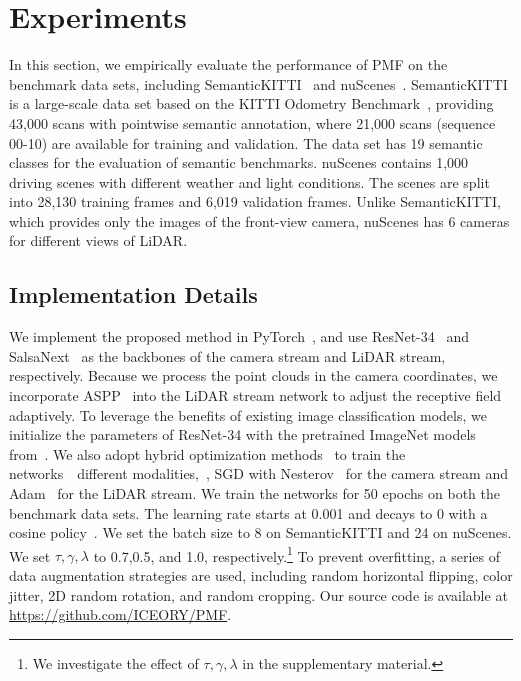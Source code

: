 \documentclass[10pt,twocolumn,letterpaper]{article}
\begin{document}
\section{Experiments}
In this section, we empirically evaluate the performance of PMF on the benchmark data sets, including SemanticKITTI~\cite{behley2019semantickitti} and nuScenes~\cite{caesar2020nuscenes}. SemanticKITTI is a large-scale data set based on the KITTI Odometry Benchmark~\cite{geiger2012we}, providing 43,000 scans with pointwise semantic annotation, where 21,000 scans (sequence 00-10) are available for training and validation. The data set has 19 semantic classes for the evaluation of semantic benchmarks. nuScenes contains 1,000 driving scenes with different weather and light conditions. The scenes are split into 28,130 training frames and 6,019 validation frames. Unlike SemanticKITTI, which provides only the images of the front-view camera, nuScenes has 6 cameras for different views of LiDAR.












\subsection{Implementation Details}
We implement the proposed method in PyTorch~\cite{paszke2019pytorch}, and use ResNet-34~\cite{he2016deep} and SalsaNext~\cite{cortinhal2020salsanext} as the  backbones of the camera stream and LiDAR stream, respectively. Because we process the point clouds in the camera coordinates, we incorporate ASPP~\cite{chen2017deeplab} into the LiDAR stream network to adjust the receptive field adaptively. To leverage the benefits of existing image classification models, we initialize the parameters of ResNet-34 with the pretrained ImageNet models from~\cite{paszke2019pytorch}. We also adopt hybrid optimization methods~\cite{zhang2020multi} to train the networks~\wrt~different modalities,~\ie, SGD with Nesterov~\cite{nesterov1983method} for the camera stream and Adam~\cite{kingma2014adam} for the LiDAR stream. We train the networks for 50 epochs on both the benchmark data sets. The learning rate starts at 0.001 and decays to 0 with a cosine policy~\cite{loshchilov2016sgdr}. We set the batch size to 8 on SemanticKITTI and 24 on nuScenes. We set $\tau,\gamma,\lambda$ to 0.7,0.5, and 1.0, respectively.\footnote{We investigate the effect of $\tau,\gamma,\lambda$ in the supplementary material.}
To prevent overfitting, a series of data augmentation strategies are used, including random horizontal flipping, color jitter, 2D random rotation, and random cropping. Our source code is available at \url{https://github.com/ICEORY/PMF}.
\end{document}
